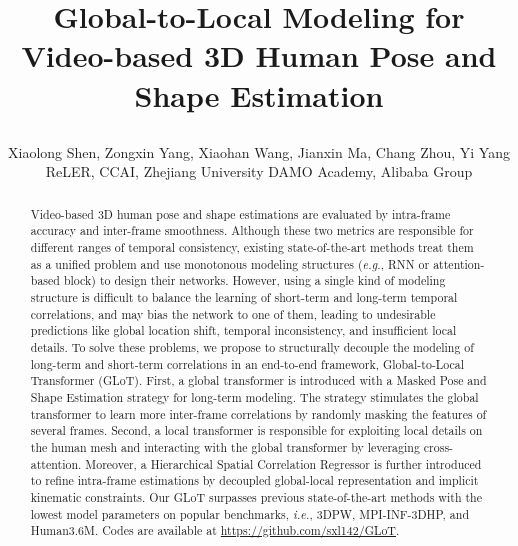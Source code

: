 \documentclass[10pt,twocolumn,letterpaper]{article}
\begin{document}
	
\title{
	
		Global-to-Local Modeling for Video-based 3D Human Pose and Shape Estimation
	}
	
	\author{
		Xiaolong Shen, Zongxin Yang, Xiaohan Wang, Jianxin Ma, Chang Zhou, Yi Yang \\
		 ReLER, CCAI, Zhejiang University \space \space \space  DAMO Academy, Alibaba Group \\
	}
	
	\maketitle
	
	
	
	
\begin{abstract} 
		Video-based 3D human pose and shape estimations are evaluated by intra-frame accuracy and inter-frame smoothness.
		Although these two metrics are responsible for different ranges of temporal consistency, existing state-of-the-art methods treat them as a unified problem and use monotonous modeling structures (\textit{e.g.}, RNN or attention-based block) to design their networks. However, using a single kind of modeling structure is difficult to balance the learning of short-term and long-term temporal correlations, and may bias the network to one of them, leading to undesirable predictions like global location shift, temporal inconsistency, and insufficient local details. 
		To solve these problems, we propose to structurally decouple the modeling of long-term and short-term correlations in an end-to-end framework, Global-to-Local Transformer (GLoT). 
		First, a global transformer is introduced with a Masked Pose and Shape Estimation strategy for long-term modeling. The strategy stimulates the global transformer to learn more inter-frame correlations by randomly masking the features of several frames.
		Second, a local transformer is responsible for exploiting local details on the human mesh and interacting with the global transformer by leveraging cross-attention. 
		Moreover, a Hierarchical Spatial Correlation Regressor is further introduced to refine intra-frame estimations by decoupled global-local representation and implicit kinematic constraints. 
		Our GLoT surpasses previous state-of-the-art methods with the lowest model parameters on popular benchmarks, \textit{i.e.}, 3DPW, MPI-INF-3DHP, and Human3.6M. Codes are available at \url{https://github.com/sxl142/GLoT}.
		
	\end{abstract}
	\renewcommand{\thefootnote}{*}
\end{document}
